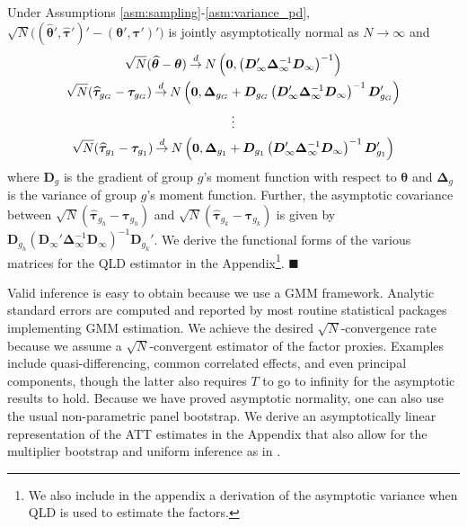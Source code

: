 \documentclass[12pt]{article}
\begin{document}
\begin{theorem}\label{theorem:asymptotic_distribution}
  Under Assumptions \ref{asm:sampling}-\ref{asm:variance_pd}, $\sqrt{N}\big((\widehat{\bm{\theta}}', \widehat{\bm \tau}')' - (\bm{\theta}', \bm \tau')'\big)$ is jointly asymptotically normal as $N \rightarrow \infty$ and
  \begin{gather*}
    \sqrt{N}(\widehat{\bm{\theta}} - \bm{\theta}) \mathbin{\overset{d}{\to}} N \left( \bm 0, \left( \bm D'_{\infty} \bm \Delta_{\infty}^{-1} \bm D_{\infty} \right)^{-1} \right) \\
    \sqrt{N}(\widehat{\bm \tau}_{g_G} - \bm \tau_{g_G}) \mathbin{\overset{d}{\to}} N \left( \bm 0, \bm \Delta_{g_G} + \bm D_{g_G} \left( \bm D'_{\infty} \bm \Delta_{\infty}^{-1} \bm D_{\infty} \right)^{-1} \bm D_{g_G}'  \right)\\
    \vdots\\
    \sqrt{N}(\widehat{\bm \tau}_{g_1} - \bm \tau_{g_1}) \mathbin{\overset{d}{\to}} N \left( \bm 0, \bm \Delta_{g_1} + \bm D_{g_1} \left( \bm D'_{\infty} \bm \Delta_{\infty}^{-1} \bm D_{\infty} \right)^{-1} \bm D_{g_1}' \right)
  \end{gather*}
where $\bm D_g$ is the gradient of group $g$'s moment function with respect to $\bm{\theta}$ and $\bm \Delta_g$ is the variance of group $g$'s moment function. Further, the asymptotic covariance between $\sqrt{N}(\widehat{\bm \tau}_{g_h} - \bm \tau_{g_h})$ and $\sqrt{N}(\widehat{\bm \tau}_{g_k} - \bm \tau_{g_k})$ is given by $\bm D_{g_h} (\bm D_{\infty}' \bm \Delta_{\infty}^{-1} \bm D_{\infty})^{-1} \bm D_{g_k}'$. We derive the functional forms of the various matrices for the QLD estimator in the Appendix\footnote{We also include in the appendix a derivation of the asymptotic variance when QLD is used to estimate the factors.}. $\blacksquare$
\end{theorem}

Valid inference is easy to obtain because we use a GMM framework. Analytic standard errors are computed and reported by most routine statistical packages implementing GMM estimation. We achieve the desired $\sqrt{N}$-convergence rate because we assume a $\sqrt{N}$-convergent estimator of the factor proxies. Examples include quasi-differencing, common correlated effects, and even principal components, though the latter also requires $T$ to go to infinity for the asymptotic results to hold. Because we have proved asymptotic normality, one can also use the usual non-parametric panel bootstrap. We derive an asymptotically linear representation of the ATT estimates in the Appendix that also allow for the multiplier bootstrap and uniform inference as in \citet{Callaway_Karami_2020}. 
\end{document}
